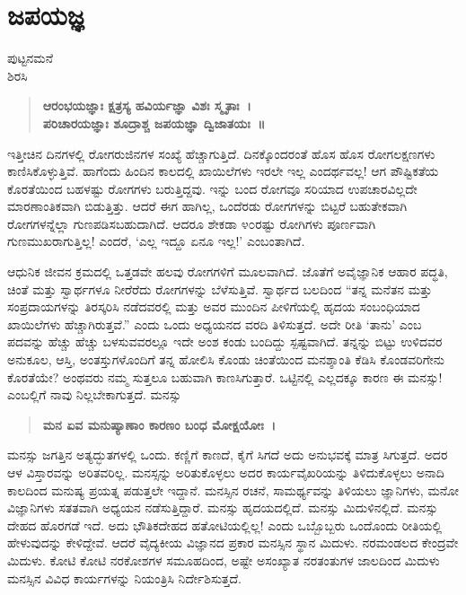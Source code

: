 {\fontsize{14}{16}\selectfont
\chapter{ಜಪಯಜ್ಞ}

\begin{center}
\smallskip
ಪುಟ್ಟನಮನೆ\\ 
ಶಿರಸಿ
\addrule
\end{center}

\begin{verse}
\textbf{ಆರಂಭಯಜ್ಞಾಃ ಕ್ಷತ್ರಸ್ಯ ಹವಿರ್ಯಜ್ಞಾ ವಿಶಃ ಸ್ಮೃತಾಃ~। \\
ಪರಿಚಾರಯಜ್ಞಾಃ ಶೂದ್ರಾಶ್ಚ ಜಪಯಜ್ಞಾ ದ್ವಿಜಾತಯಃ~॥}
\end{verse}
ಇತ್ತೀಚಿನ ದಿನಗಳಲ್ಲಿ ರೋಗರುಜಿನಗಳ ಸಂಖ್ಯೆ ಹೆಚ್ಚಾಗುತ್ತಿದೆ. ದಿನಕ್ಕೊಂದರಂತೆ ಹೊಸ ಹೊಸ ರೋಗಲಕ್ಷಣಗಳು ಕಾಣಿಸಿಕೊಳ್ಳುತ್ತಿವೆ. ಹಾಗೆಂದು ಹಿಂದಿನ ಕಾಲದಲ್ಲಿ ಖಾಯಿಲೆ\-ಗಳು ಇರಲೇ ಇಲ್ಲ ಎಂದರ್ಥವಲ್ಲ! ಆಗ ಪೌಷ್ಟಿಕತೆಯ ಕೊರತೆಯಿಂದ ಬಹಳಷ್ಟು ರೋಗಗಳು ಬರುತ್ತಿದ್ದವು. ಇನ್ನು ಬಂದ ರೋಗವೂ ಸರಿಯಾದ ಉಪಚಾರವಿಲ್ಲದೇ ಮಾರಣಾಂತಿಕ\-ವಾಗಿ ಬಿಡುತ್ತಿತ್ತು. ಆದರೆ ಈಗ ಹಾಗಿಲ್ಲ, ಒಂದೆರಡು ರೋಗಗಳನ್ನು ಬಿಟ್ಟರೆ ಬಹುತೇಕವಾಗಿ ರೋಗಗಳನ್ನೆಲ್ಲಾ ಗುಣಪಡಿಸಬಹುದಾಗಿದೆ. ಆದರೂ ಶೇಕಡಾ ೪೦ರಷ್ಟು ರೋಗಿಗಳು ಪೂರ್ಣವಾಗಿ ಗುಣಮುಖರಾಗುತ್ತಿಲ್ಲ! ಎಂದರೆ, ‘ಎಲ್ಲ ಇದ್ದೂ ಏನೂ ಇಲ್ಲ!’ ಎಂಬಂತಾಗಿದೆ.

ಆಧುನಿಕ ಜೀವನ ಕ್ರಮದಲ್ಲಿ ಒತ್ತಡವೇ ಹಲವು ರೋಗಗಳಿಗೆ ಮೂಲವಾಗಿದೆ. ಜೊತೆಗೆ ಅವೈಜ್ಞಾನಿಕ ಆಹಾರ ಪದ್ಧತಿ, ಚಿಂತೆ ಮತ್ತು ಸ್ವಾರ್ಥಗಳೂ ನೀರೆರೆದು ರೋಗಗಳನ್ನು ಬೆಳೆಸುತ್ತಿವೆ. ಸ್ವಾರ್ಥದ ಬಲದಿಂದ “ತನ್ನ ಮನೆತನ ಮತ್ತು ಸಂಪ್ರದಾಯಗಳನ್ನು ತಿರಸ್ಕರಿಸಿ ನಡೆದವರಲ್ಲಿ ಮತ್ತು ಅವರ ಮುಂದಿನ ಪೀಳಿಗೆಯಲ್ಲಿ ಹೃದಯ ಸಂಬಂಧಿಯಾದ ಖಾಯಿಲೆಗಳು ಹೆಚ್ಚಾಗಿರುತ್ತವೆ.” ಎಂದು ಒಂದು ಅಧ್ಯಯನದ ವರದಿ ತಿಳಿಸುತ್ತದೆ. ಅದೇ ರೀತಿ ‘ತಾನು’ ಎಂಬ ಪದವನ್ನು ಹೆಚ್ಚು ಹೆಚ್ಚು ಬಳಸುವವರಲ್ಲೂ ಇದೇ ಅಂಶ ಕಂಡು ಬಂದಿದ್ದು ಸ್ಪಷ್ಟವಾಗಿದೆ. ತನ್ನನ್ನು ಬಿಟ್ಟು ಉಳಿದವರ ಅನುಕೂಲ, ಆಸ್ತಿ, ಅಂತಸ್ತುಗಳೊಂದಿಗೆ ತನ್ನ ಹೋಲಿಸಿ ಕೊಂಡು ಚಿಂತೆಯಿಂದ ಮನಶ್ಶಾಂತಿ ಕೆಡಿಸಿ ಕೊಂಡವರಿಗೇನು ಕೊರತೆಯೇ? ಅಂಥವರು ನಮ್ಮ ಸುತ್ತಲೂ ಬಹುವಾಗಿ ಕಾಣಸಿಗುತ್ತಾರೆ. ಒಟ್ಟಿನಲ್ಲಿ ಎಲ್ಲದಕ್ಕೂ ಕಾರಣ ಈ ಮನಸ್ಸು! ಎಂಬಲ್ಲಿಗೆ ನಾವು ನಿಲ್ಲಬೇಕಾಗುತ್ತದೆ. ಮನಸ್ಸು
\begin{verse}  
\textbf{ಮನ ಏವ ಮನುಷ್ಯಾಣಾಂ ಕಾರಣಂ ಬಂಧ ಮೋಕ್ಷಯೋಃ~। }
\end{verse}
ಮನಸ್ಸು ಜಗತ್ತಿನ ಅತ್ಯದ್ಭುತಗಳಲ್ಲಿ ಒಂದು. ಕಣ್ಣಿಗೆ ಕಾಣದೆ, ಕೈಗೆ ಸಿಗದೆ ಅದು ಅನು\-ಭವಕ್ಕೆ ಮಾತ್ರ ಸಿಗುತ್ತದೆ. ಅದರ ಆಳ ವಿಸ್ತಾರವನ್ನು ಅರಿತವರಿಲ್ಲ. ಮನಸ್ಸನ್ನು ಅರಿತು\-ಕೊಳ್ಳಲು ಅದರ ಕಾರ್ಯವೈಖರಿಯನ್ನು ತಿಳಿದುಕೊಳ್ಳಲು ಅನಾದಿ ಕಾಲದಿಂದ ಮನುಷ್ಯ ಪ್ರಯತ್ನ ಪಡುತ್ತಲೇ ಇದ್ದಾನೆ. ಮನಸ್ಸಿನ ರಚನೆ, ಸಾಮರ್ಥ್ಯವನ್ನು ತಿಳಿಯಲು ಜ್ಞಾನಿಗಳು, ಮನೋ ವಿಜ್ಞಾನಿಗಳು ಸತತವಾಗಿ ಅಧ್ಯಯನ ನಡೆಸುತ್ತಿದ್ದಾರೆ. ಮನಸ್ಸು ಹೃದಯ\-ದಲ್ಲಿದೆ. ಮನಸ್ಸು ಮಿದುಳಿನಲ್ಲಿದೆ. ಮನಸ್ಸು ದೇಹದ ಹೊರಗಡೆ ಇದೆ. ಅದು ಭೌತಿಕದೇಹದ ಹತೋಟಿಯಲ್ಲಿಲ್ಲ! ಎಂದು ಒಬ್ಬೊಬ್ಬರು ಒಂದೊಂದು ರೀತಿಯಲ್ಲಿ ಹೇಳುವುದನ್ನು ಕೇಳಿದ್ದೇವೆ. ಆದರೆ ವೈದ್ಯಕೀಯ ವಿಜ್ಞಾನದ ಪ್ರಕಾರ ಮನಸ್ಸಿನ ಸ್ಥಾನ ಮಿದುಳು. ನರ\-ಮಂಡಲದ ಕೇಂದ್ರವೇ ಮಿದುಳು. ಕೋಟಿ ಕೋಟಿ ನರಕೋಶಗಳ ಸಮೂಹದಿಂದ, ಅಷ್ಟೇ ಅಸಂಖ್ಯಾತ ನರತಂತುಗಳ ಜಾಲದಿಂದ ಮಿದುಳು ಮನಸ್ಸಿನ ವಿವಿಧ ಕಾರ್ಯ\-ಗಳನ್ನು ನಿಯಂತ್ರಿಸಿ ನಿರ್ದೇಶಿಸುತ್ತದೆ.

}
